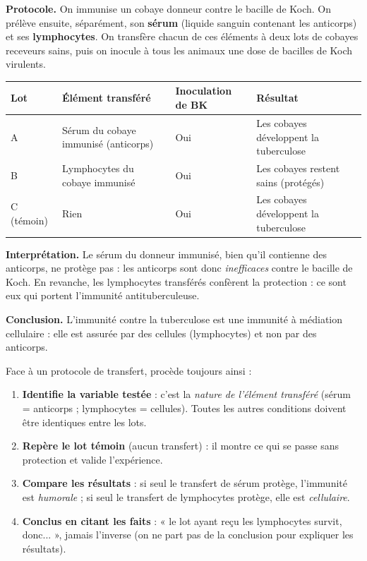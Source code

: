 \documentclass[11pt]{article}
\newcommand{\cle}[1]{{\popxbold\color{popdark}#1}}
\begin{document}
\begin{experience}
\textbf{Protocole.} On immunise un cobaye donneur contre le bacille de Koch. On prélève ensuite, séparément, son \textbf{sérum} (liquide sanguin contenant les anticorps) et ses \textbf{lymphocytes}. On transfère chacun de ces éléments à deux lots de cobayes receveurs sains, puis on inocule à tous les animaux une dose de bacilles de Koch virulents.

\begin{center}
\begin{tabularx}{\linewidth}{|l|X|X|X|}
\hline
\rowcolor{popblueL} \textbf{Lot} & \textbf{Élément transféré} & \textbf{Inoculation de BK} & \textbf{Résultat} \\
\hline
A & Sérum du cobaye immunisé (anticorps) & Oui & Les cobayes développent la tuberculose \\
\hline
B & Lymphocytes du cobaye immunisé & Oui & Les cobayes restent sains (protégés) \\
\hline
C (témoin) & Rien & Oui & Les cobayes développent la tuberculose \\
\hline
\end{tabularx}
\end{center}

\textbf{Interprétation.} Le sérum du donneur immunisé, bien qu'il contienne des anticorps, ne protège pas : les anticorps sont donc \emph{inefficaces} contre le bacille de Koch. En revanche, les lymphocytes transférés confèrent la protection : ce sont eux qui portent l'immunité antituberculeuse.

\textbf{Conclusion.} L'immunité contre la tuberculose est une immunité à \cle{médiation cellulaire} : elle est assurée par des cellules (lymphocytes) et non par des anticorps.
\end{experience}

\begin{methode}
Face à un protocole de transfert, procède toujours ainsi :
\begin{enumerate}
\item \textbf{Identifie la variable testée} : c'est la \emph{nature de l'élément transféré} (sérum = anticorps ; lymphocytes = cellules). Toutes les autres conditions doivent être identiques entre les lots.
\item \textbf{Repère le lot témoin} (aucun transfert) : il montre ce qui se passe sans protection et valide l'expérience.
\item \textbf{Compare les résultats} : si seul le transfert de sérum protège, l'immunité est \emph{humorale} ; si seul le transfert de lymphocytes protège, elle est \emph{cellulaire}.
\item \textbf{Conclus en citant les faits} : « le lot ayant reçu les lymphocytes survit, donc... », jamais l'inverse (on ne part pas de la conclusion pour expliquer les résultats).
\end{enumerate}
\end{methode}
\end{document}

